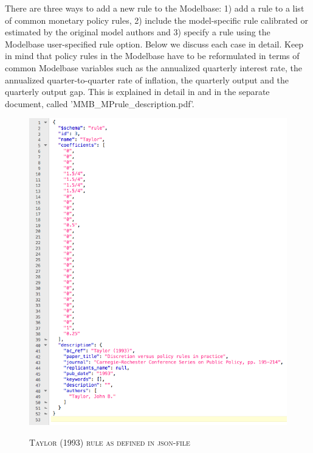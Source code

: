 \vspace{0.5cm}
%
There are three ways to add a new rule to the Modelbase: 1) add a rule to a list of common monetary policy rules, 2) include the model-specific rule calibrated or estimated by the original model authors and 3) specify a rule using the Modelbase user-specified rule option. Below we discuss each case in detail. Keep in mind that policy rules in the Modelbase have to be reformulated in terms of common Modelbase variables such as the annualized quarterly interest rate, the annualized quarter-to-quarter rate of inflation, the quarterly output and the quarterly output gap. This is explained in detail in \cite{WCMSW2012} and in the separate document, called 'MMB\_MPrule\_description.pdf'. 
\newline


        \begin{figure}
        \centering
        \caption{\textsc{Taylor (1993) rule as defined in json-file}}
        \vspace{0.2cm}
        \includegraphics[width=13cm,keepaspectratio]{userrulejson.png}
        \label{img:userruletaylorjson}
        \end{figure}




